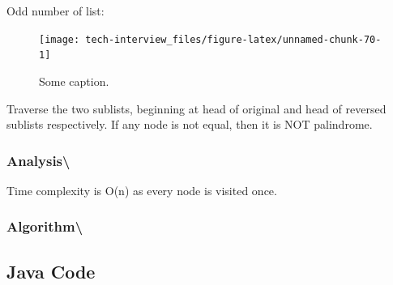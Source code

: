 \documentclass[]{book}
\begin{document}
Odd number of list:

\begin{figure}
\texttt{[image: tech-interview\_files/figure-latex/unnamed-chunk-70-1]} \caption{Some caption.}\label{fig:unnamed-chunk-70}
\end{figure}

Traverse the two sublists, beginning at head of original and head of reversed sublists respectively. If any node is
not equal, then it is NOT palindrome.

\hypertarget{analysis-118}{%
\subsubsection{Analysis\textbackslash{}}\label{analysis-118}}

Time complexity is O(n) as every node is visited once.

\hypertarget{algorithm-124}{%
\subsubsection{Algorithm\textbackslash{}}\label{algorithm-124}}

\hypertarget{java-code-73}{%
\subsection{Java Code}\label{java-code-73}}
\end{document}
